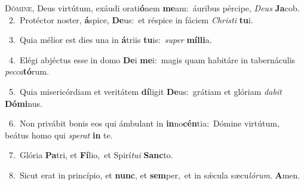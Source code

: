 \lettrine{\initial\textcolor{\initialcolor}{D}}{ómine,} Deus virtútum, exáudi orati\-\textbf{ó}\-nem \textbf{me}\-am:~\star áuribus pércipe, \textit{De}\-\textit{us} \textbf{Ja}\-cob.\\
{\numbfont\textcolor{\numbcolor}{~2.}}~Protéctor noster, \textbf{á}\-spice, \textbf{De}\-us:~\star et réspice in fáciem \textit{Chris}\-\textit{ti} \textbf{tu}\-i.\par
{\numbfont\textcolor{\numbcolor}{~3.}}~Quia mélior est dies una in \textbf{á}\-triis \textbf{tu}\-is:~\star \textit{su}\-\textit{per} \textbf{míl}\-\textbf{li}a.\par
{\numbfont\textcolor{\numbcolor}{~4.}}~Elégi abjéctus esse in domo \textbf{De}\-i \textbf{me}\-i:~\star magis quam habitáre in tabernáculis \textit{pec}\-\textit{ca}\textbf{tó}rum.\par
{\numbfont\textcolor{\numbcolor}{~5.}}~Quia misericórdiam et veritátem \textbf{dí}\-ligit \textbf{De}\-us:~\star grátiam et glóriam \textit{da}\-\textit{bit} \textbf{Dó}\-\textbf{mi}nus.\par
{\numbfont\textcolor{\numbcolor}{~6.}}~Non privábit bonis eos qui ámbulant in \textbf{in}\-no\-\textbf{cén}\-tia:~\star Dómine virtútum, beátus homo qui \textit{spe}\-\textit{rat} \textbf{in} te.\par
{\numbfont\textcolor{\numbcolor}{~7.}}~Glória \textbf{Pa}\-tri, et \textbf{Fí}\-lio,~\star et Spirí\-\textit{tu}\-\textit{i} \textbf{Sanc}\-to.\par
{\numbfont\textcolor{\numbcolor}{~8.}}~Sicut erat in princípio, et \textbf{nunc}\-, et \textbf{sem}\-per,~\star et in sǽcula sæcu\-\textit{ló}\-\textit{rum}. \textbf{A}\-men.\par
